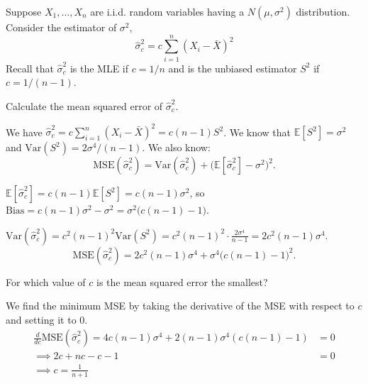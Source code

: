 \documentclass{article}
\newcommand{\E}{\mathbb{E}}
\newcommand{\V}{\text{Var}}
\begin{document}
\begin{probset}
\begin{prob}[\textbf{7.3.10}]
    Suppose $X_1, \ldots, X_n$ are i.i.d. random variables having a $N (\mu, \sigma^2)$ distribution. Consider the estimator of $\sigma^2$,
    $$\hat{\sigma}^2_c = c \sum_{i=1}^n (X_i - \bar{X})^2$$
    Recall that $\hat{\sigma}^2_c$ is the MLE if $c = 1/n$ and is the unbiased estimator $S^2$ if $c = 1/(n - 1)$.

    \begin{subprobset}
    \begin{subprob}
        Calculate the mean squared error of $\hat{\sigma}^2_c$.

        \begin{soln}
            We have $\hat{\sigma}^2_c = c \sum_{i=1}^n (X_i - \bar{X})^2 = c(n-1)S^2$. We know that $\E[S^2] = \sigma^2$ and $\V(S^2) = 2\sigma^4/(n-1)$. We also know:
            \[
                \text{MSE}(\hat{\sigma}^2_c) = \V(\hat{\sigma}^2_c) + \bigl(\E[\hat{\sigma}^2_c] - \sigma^2\bigr)^2.
            \]

            $\E[\hat{\sigma}^2_c] = c(n-1)\E[S^2] = c(n-1)\sigma^2$, so $\text{Bias} = c(n-1)\sigma^2 - \sigma^2 = \sigma^2\bigl(c(n-1) - 1\bigr)$.

            $\V(\hat{\sigma}^2_c) = c^2(n-1)^2 \V(S^2) = c^2(n-1)^2 \cdot \frac{2\sigma^4}{n-1} = 2c^2(n-1)\sigma^4$.
            \[
                \text{MSE}(\hat{\sigma}^2_c) = 2c^2(n-1)\sigma^4 + \sigma^4\bigl(c(n-1) - 1\bigr)^2.
            \]
        \end{soln}
    \end{subprob}

    \begin{subprob}
        For which value of $c$ is the mean squared error the smallest?

        \begin{soln}
            We find the minimum MSE by taking the derivative of the MSE with respect to $c$ and setting it to 0.
            \begin{align*}
                \frac{d}{dc} \text{MSE}(\hat{\sigma}^2_c) = 4c(n-1)\sigma^4 + 2(n - 1)\sigma^4(c(n-1) - 1) &= 0 \\
                \implies 2c + nc - c - 1 &= 0 \\
                \implies c = \frac{1}{n + 1}
            \end{align*}
        \end{soln}
    \end{subprob}
    \end{subprobset}
\end{prob}


\end{probset}
\end{document}
